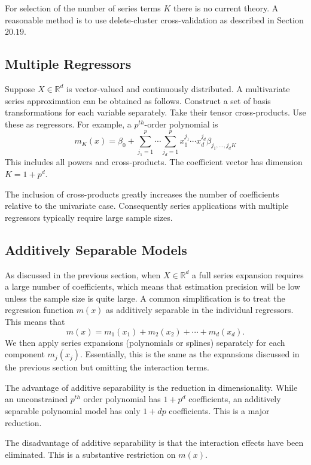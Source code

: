 \documentclass[10pt]{article}
\begin{document}
For selection of the number of series terms $K$ there is no current theory. A reasonable method is to use delete-cluster cross-validation as described in Section $20.19$.

\subsection{Multiple Regressors}
Suppose $X \in \mathbb{R}^{d}$ is vector-valued and continuously distributed. A multivariate series approximation can be obtained as follows. Construct a set of basis transformations for each variable separately. Take their tensor cross-products. Use these as regressors. For example, a $p^{t h}$-order polynomial is
$$
m_{K}(x)=\beta_{0}+\sum_{j_{1}=1}^{p} \cdots \sum_{j_{d}=1}^{p} x_{1}^{j_{1}} \cdots x_{d}^{j_{d}} \beta_{j_{1}, \ldots, j_{d} K}
$$
This includes all powers and cross-products. The coefficient vector has dimension $K=1+p^{d}$.

The inclusion of cross-products greatly increases the number of coefficients relative to the univariate case. Consequently series applications with multiple regressors typically require large sample sizes.

\subsection{Additively Separable Models}
As discussed in the previous section, when $X \in \mathbb{R}^{d}$ a full series expansion requires a large number of coefficients, which means that estimation precision will be low unless the sample size is quite large. A common simplification is to treat the regression function $m(x)$ as additively separable in the individual regressors. This means that
$$
m(x)=m_{1}\left(x_{1}\right)+m_{2}\left(x_{2}\right)+\cdots+m_{d}\left(x_{d}\right) .
$$
We then apply series expansions (polynomials or splines) separately for each component $m_{j}\left(x_{j}\right)$. Essentially, this is the same as the expansions discussed in the previous section but omitting the interaction terms.

The advantage of additive separability is the reduction in dimensionality. While an unconstrained $p^{t h}$ order polynomial has $1+p^{d}$ coefficients, an additively separable polynomial model has only $1+d p$ coefficients. This is a major reduction.

The disadvantage of additive separability is that the interaction effects have been eliminated. This is a substantive restriction on $m(x)$.
\end{document}
